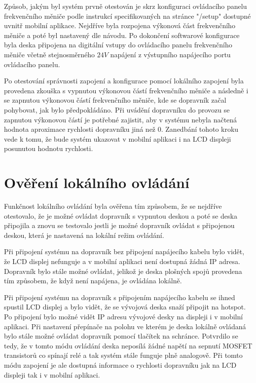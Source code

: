 Způsob, jakým byl systém prvně otestován je skrz konfiguraci ovládacího panelu frekvenčního měniče podle instrukcí specifikovaných na stránce "/setup" dostupné uvnitř mobilní aplikace. Nejdříve byla rozpojena výkonová část frekvenčního měniče a poté byl nastavený dle návodu. Po dokončení softwarové konfigurace byla deska připojena na digitální vstupy do ovládacího panelu frekvenčního měniče včetně stejnosměrného $24V$ napájení z výstupního napájecího portu ovládacího panelu.

Po otestování správnosti zapojení a konfigurace pomocí lokálního zapojení byla provedena zkouška s vypnutou výkonovou částí frekvenčního měniče a následně i se zapnutou výkonovou částí frekvenčního měniče, kde se dopravník začal pohybovat, jak bylo předpokládáno. Při uvádění dopravníku do provozu se zapnutou výkonovou částí je potřebné zajistit, aby v systému nebyla načtená hodnota aproximace rychlosti dopravníku jiná než 0. Zanedbání tohoto kroku vede k tomu, že bude systém ukazovat v mobilní aplikaci i na LCD displeji posunutou hodnotu rychlosti.

\section{Ověření lokálního ovládání}

Funkčnost lokálního ovládání byla ověřena tím způsobem, že se nejdříve otestovalo, že je možné ovládat dopravník s vypnutou deskou a poté se deska připojila a znovu se testovalo jestli je možné dopravník ovládat s připojenou deskou, která je nastavená na lokální režim ovládání.

Při připojení systému na dopravník bez připojení napájecího kabelu bylo vidět, že LCD displej nefunguje a v mobilní aplikaci není dostupná žádná IP adresa. Dopravník bylo stále možné ovládat, jelikož je deska plošných spojů provedena tím způsobem, že když není napájena, je ovládána lokálně.

Při připojení systému na dopravník s připojením napájecího kabelu se ihned spustil LCD displej a bylo vidět, že se vývojová deska snaží připojit na hotspot. Po připojení bylo možné vidět IP adresu vývojové desky na displeji i v mobilní aplikaci. Při nastavení přepínače na polohu ve kterém je deska lokálně ovládaná bylo stále možné ovládat dopravník pomocí tlačítek na schránce. Potvrdilo se tedy, že v tomto módu ovládání deska neposílá žádné napětí na sepnutí MOSFET transistorů co spínají relé a tak systém stále funguje plně analogově. Při tomto módu zapojení je ale dostupná informace o rychlosti dopravníku jak na LCD displeji tak i v mobilní aplikaci.


